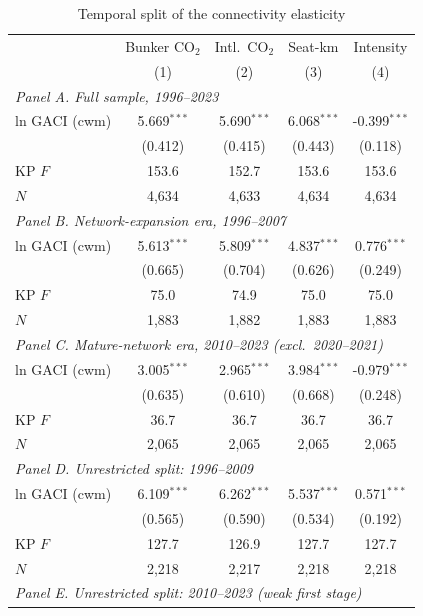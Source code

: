 \documentclass[12pt]{article}
\begin{document}
\begin{table}[htbp]
\centering
\begin{threeparttable}
\caption{Temporal split of the connectivity elasticity}
\label{tab:temporal}
\footnotesize
\begin{tabular}{lcccc}
\toprule
 & \multicolumn{1}{c}{Bunker CO$_2$} & \multicolumn{1}{c}{Intl.\ CO$_2$} & \multicolumn{1}{c}{Seat-km} & \multicolumn{1}{c}{Intensity} \\
 & (1) & (2) & (3) & (4) \\
\midrule
\multicolumn{5}{l}{\textit{Panel A. Full sample, 1996--2023}} \\
  ln GACI (cwm) & 5.669$^{***}$ & 5.690$^{***}$ & 6.068$^{***}$ & -0.399$^{***}$ \\
   & (0.412) & (0.415) & (0.443) & (0.118) \\
  KP $F$ & 153.6 & 152.7 & 153.6 & 153.6 \\
  $N$ & 4,634 & 4,633 & 4,634 & 4,634 \\
\midrule
\multicolumn{5}{l}{\textit{Panel B. Network-expansion era, 1996--2007}} \\
  ln GACI (cwm) & 5.613$^{***}$ & 5.809$^{***}$ & 4.837$^{***}$ & 0.776$^{***}$ \\
   & (0.665) & (0.704) & (0.626) & (0.249) \\
  KP $F$ & 75.0 & 74.9 & 75.0 & 75.0 \\
  $N$ & 1,883 & 1,882 & 1,883 & 1,883 \\
\midrule
\multicolumn{5}{l}{\textit{Panel C. Mature-network era, 2010--2023 (excl.\ 2020--2021)}} \\
  ln GACI (cwm) & 3.005$^{***}$ & 2.965$^{***}$ & 3.984$^{***}$ & -0.979$^{***}$ \\
   & (0.635) & (0.610) & (0.668) & (0.248) \\
  KP $F$ & 36.7 & 36.7 & 36.7 & 36.7 \\
  $N$ & 2,065 & 2,065 & 2,065 & 2,065 \\
\midrule
\multicolumn{5}{l}{\textit{Panel D. Unrestricted split: 1996--2009}} \\
  ln GACI (cwm) & 6.109$^{***}$ & 6.262$^{***}$ & 5.537$^{***}$ & 0.571$^{***}$ \\
   & (0.565) & (0.590) & (0.534) & (0.192) \\
  KP $F$ & 127.7 & 126.9 & 127.7 & 127.7 \\
  $N$ & 2,218 & 2,217 & 2,218 & 2,218 \\
\midrule
\multicolumn{5}{l}{\textit{Panel E. Unrestricted split: 2010--2023 (weak first stage)}} \\

\end{tabular}
\end{threeparttable}
\end{table}
\end{document}
